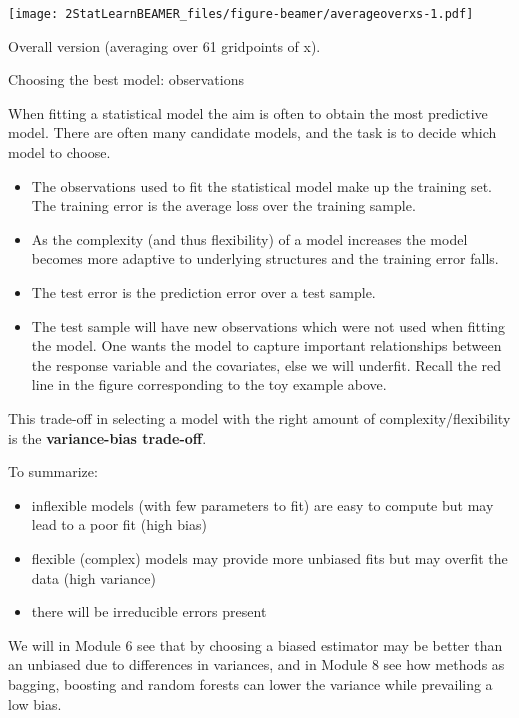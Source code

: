 \documentclass[ignorenonframetext,]{beamer}
\providecommand{\tightlist}{%
  \setlength{\itemsep}{0pt}\setlength{\parskip}{0pt}}
\begin{document}
\begin{frame}

\texttt{[image: 2StatLearnBEAMER\_files/figure-beamer/averageoverxs-1.pdf]}

Overall version (averaging over 61 gridpoints of x).

\end{frame}

\begin{frame}

\begin{block}{Choosing the best model: observations}

When fitting a statistical model the aim is often to obtain the most
predictive model. There are often many candidate models, and the task is
to decide which model to choose.

\begin{itemize}
\tightlist
\item
  The observations used to fit the statistical model make up the
  training set. The training error is the average loss over the training
  sample.
\item
  As the complexity (and thus flexibility) of a model increases the
  model becomes more adaptive to underlying structures and the training
  error falls.
\item
  The test error is the prediction error over a test sample.
\item
  The test sample will have new observations which were not used when
  fitting the model. One wants the model to capture important
  relationships between the response variable and the covariates, else
  we will underfit. Recall the red line in the figure corresponding to
  the toy example above.
\end{itemize}

\end{block}

\end{frame}

\begin{frame}

This trade-off in selecting a model with the right amount of
complexity/flexibility is the \textbf{variance-bias trade-off}.

To summarize:

\begin{itemize}
\tightlist
\item
  inflexible models (with few parameters to fit) are easy to compute but
  may lead to a poor fit (high bias)
\item
  flexible (complex) models may provide more unbiased fits but may
  overfit the data (high variance)
\item
  there will be irreducible errors present
\end{itemize}

We will in Module 6 see that by choosing a biased estimator may be
better than an unbiased due to differences in variances, and in Module 8
see how methods as bagging, boosting and random forests can lower the
variance while prevailing a low bias.

\end{frame}
\end{document}
